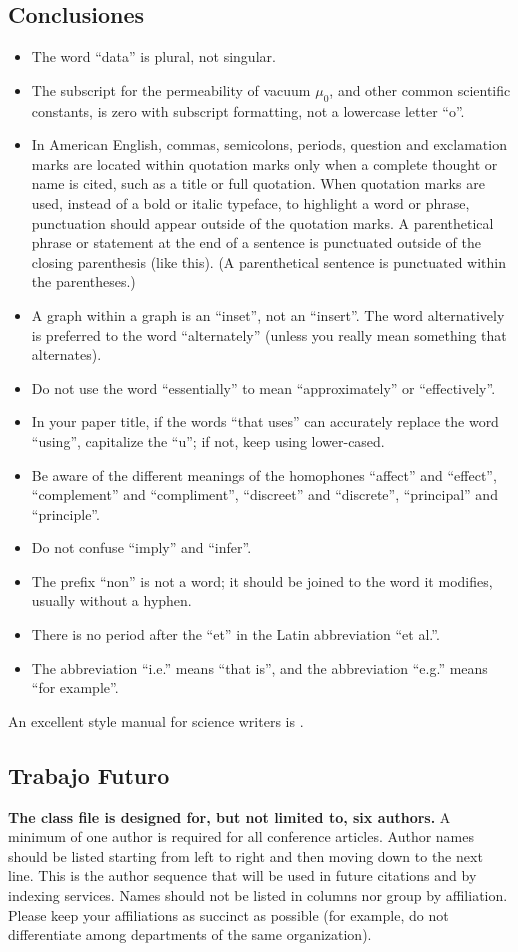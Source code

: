 \documentclass[conference]{IEEEtran}
\begin{document}
\subsection{Conclusiones}
\begin{itemize}
\item The word ``data'' is plural, not singular.
\item The subscript for the permeability of vacuum $\mu_{0}$, and other common scientific constants, is zero with subscript formatting, not a lowercase letter ``o''.
\item In American English, commas, semicolons, periods, question and exclamation marks are located within quotation marks only when a complete thought or name is cited, such as a title or full quotation. When quotation marks are used, instead of a bold or italic typeface, to highlight a word or phrase, punctuation should appear outside of the quotation marks. A parenthetical phrase or statement at the end of a sentence is punctuated outside of the closing parenthesis (like this). (A parenthetical sentence is punctuated within the parentheses.)
\item A graph within a graph is an ``inset'', not an ``insert''. The word alternatively is preferred to the word ``alternately'' (unless you really mean something that alternates).
\item Do not use the word ``essentially'' to mean ``approximately'' or ``effectively''.
\item In your paper title, if the words ``that uses'' can accurately replace the word ``using'', capitalize the ``u''; if not, keep using lower-cased.
\item Be aware of the different meanings of the homophones ``affect'' and ``effect'', ``complement'' and ``compliment'', ``discreet'' and ``discrete'', ``principal'' and ``principle''.
\item Do not confuse ``imply'' and ``infer''.
\item The prefix ``non'' is not a word; it should be joined to the word it modifies, usually without a hyphen.
\item There is no period after the ``et'' in the Latin abbreviation ``et al.''.
\item The abbreviation ``i.e.'' means ``that is'', and the abbreviation ``e.g.'' means ``for example''.
\end{itemize}
An excellent style manual for science writers is \cite{b7}.

\subsection{Trabajo Futuro}
\textbf{The class file is designed for, but not limited to, six authors.} A 
minimum of one author is required for all conference articles. Author names 
should be listed starting from left to right and then moving down to the 
next line. This is the author sequence that will be used in future citations 
and by indexing services. Names should not be listed in columns nor group by 
affiliation. Please keep your affiliations as succinct as possible (for 
example, do not differentiate among departments of the same organization).
\end{document}
